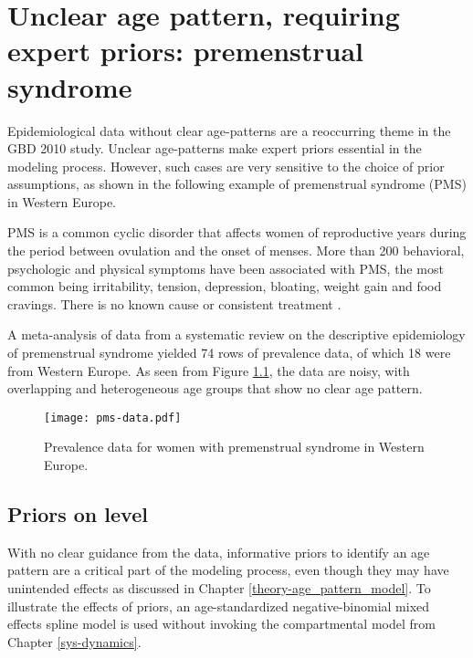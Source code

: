 \chapter{Unclear age pattern, requiring expert priors: premenstrual syndrome}
\label{applications-priors_knots_select}

Epidemiological data without clear age-patterns are a reoccurring theme in the GBD 2010 study.  Unclear age-patterns make expert priors essential in the modeling process.  However, such cases are very sensitive to the choice of prior assumptions, as shown in the following example of premenstrual syndrome (PMS) in Western Europe.

PMS is a common cyclic disorder that affects women of reproductive years during the period between ovulation and the onset of menses.  More than 200 behavioral, psychologic and physical symptoms have been associated with PMS, the most common being irritability, tension, depression, bloating, weight gain and food cravings.  There is no known cause or consistent treatment \cite{dickerson_premenstrual_2003, singh_incidence_1998, goodale_alleviation_1990}.

A meta-analysis of data from a systematic review on the descriptive epidemiology of premenstrual syndrome yielded 74 rows of prevalence data, of which 18 were from Western Europe.  As seen from Figure \ref{fig:app-pms_data}, the data are noisy, with overlapping and heterogeneous age groups that show no clear age pattern.

    \begin{figure}[h]
        \begin{center}
            \texttt{[image: pms-data.pdf]}
            \caption{Prevalence data for women with premenstrual syndrome in Western Europe.}
        \end{center}
        \label{fig:app-pms_data}
    \end{figure}

\section{Priors on level} \label{sec:app-priors on level}
With no clear guidance from the data, informative priors to identify an age pattern are a critical part of the modeling process, even though they may have unintended effects as discussed in Chapter \ref{theory-age_pattern_model}.  To illustrate the effects of priors, an age-standardized negative-binomial mixed effects spline model is used without invoking the compartmental model from Chapter \ref{sys-dynamics}.

